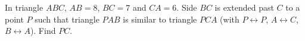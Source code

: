 In triangle $ABC$, $AB=8$, $BC=7$ and $CA=6$. Side $BC$ is extended past $C$ to a point $P$ such that triangle $PAB$ is similar to triangle $PCA$ (with $P\leftrightarrow P$, $A\leftrightarrow C$, $B\leftrightarrow A$). Find $PC$.
